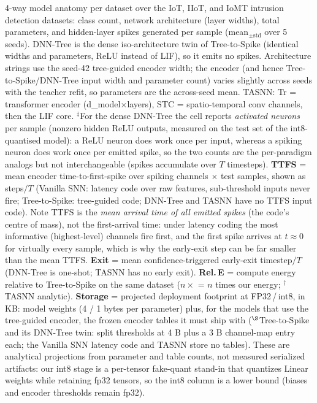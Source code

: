 \begin{table}[!ht]
\centering
\renewcommand{\arraystretch}{1.05}
\caption{4-way model anatomy per dataset over the IoT, IIoT, and IoMT intrusion detection datasets: class count, network architecture (layer widths), total parameters, and hidden-layer spikes generated per sample (mean$_{\pm\text{std}}$ over 5 seeds). DNN-Tree is the dense iso-architecture twin of Tree-to-Spike (identical widths and parameters, ReLU instead of LIF), so it emits no spikes. Architecture strings use the seed-42 tree-guided encoder width; the encoder (and hence Tree-to-Spike/DNN-Tree input width and parameter count) varies slightly across seeds with the teacher refit, so parameters are the across-seed mean. TASNN: Tr = transformer encoder (d\_model$\times$layers), STC = spatio-temporal conv channels, then the LIF core. $^\ddagger$For the dense DNN-Tree the cell reports \emph{activated neurons} per sample (nonzero hidden ReLU outputs, measured on the test set of the int8-quantised model): a ReLU neuron does work once per input, whereas a spiking neuron does work once per emitted spike, so the two counts are the per-paradigm analogs but not interchangeable (spikes accumulate over $T$ timesteps). \textbf{TTFS} = mean encoder time-to-first-spike over spiking channels $\times$ test samples, shown as steps$/T$ (Vanilla SNN: latency code over raw features, sub-threshold inputs never fire; Tree-to-Spike: tree-guided code; DNN-Tree and TASNN have no TTFS input code). Note TTFS is the \emph{mean arrival time of all emitted spikes} (the code's centre of mass), not the first-arrival time: under latency coding the most informative (highest-level) channels fire first, and the first spike arrives at $t \approx 0$ for virtually every sample, which is why the early-exit step can be far smaller than the mean TTFS. \textbf{Exit} = mean confidence-triggered early-exit timestep$/T$ (DNN-Tree is one-shot; TASNN has no early exit). \textbf{Rel.\,E} = compute energy relative to Tree-to-Spike on the same dataset ($n\times$ = $n$ times our energy; $^\dagger$TASNN analytic). \textbf{Storage} = projected deployment footprint at FP32\,/\,int8, in KB: model weights (4 / 1 bytes per parameter) plus, for the models that use the tree-guided encoder, the frozen encoder tables it must ship with ($^{\S}$Tree-to-Spike and its DNN-Tree twin: split thresholds at 4 B plus a 3 B channel-map entry each; the Vanilla SNN latency code and TASNN store no tables). These are analytical projections from parameter and table counts, not measured serialized artifacts: our int8 stage is a per-tensor fake-quant stand-in that quantizes Linear weights while retaining fp32 tensors, so the int8 column is a lower bound (biases and encoder thresholds remain fp32).}

\end{table}
